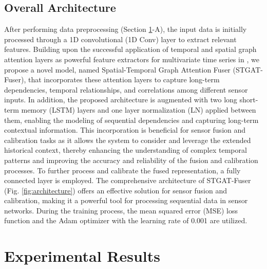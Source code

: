 \documentclass[conference,a4paper]{IEEEtran}
\begin{document}
\subsection{Overall Architecture}
After performing data preprocessing (Section \ref{sec:results}-A), the input data is initially processed through a 1D convolutional (1D Conv) layer to extract relevant features. Building upon the successful application of temporal and spatial graph attention layers as powerful feature extractors for multivariate time series in \cite{MTADGAT}, we propose a novel model, named Spatial-Temporal Graph Attention Fuser (STGAT-Fuser), that incorporates these attention layers to capture long-term dependencies, temporal relationships, and correlations among different sensor inputs. In addition, the proposed architecture is augmented with two long short-term memory (LSTM) layers \cite{lstm} and one layer normalization (LN) \cite{ba2016layer} applied between them, enabling the modeling of sequential dependencies and capturing long-term contextual information. This incorporation is beneficial for sensor fusion and calibration tasks as it allows the system to consider and leverage the extended historical context, thereby enhancing the understanding of complex temporal patterns and improving the accuracy and reliability of the fusion and calibration processes. To further process and calibrate the fused representation, a fully connected layer is employed. The comprehensive architecture of STGAT-Fuser (Fig. \ref{fig:architecture}) offers an effective solution for sensor fusion and calibration, making it a powerful tool for processing sequential data in sensor networks. During the training process, the mean squared error (MSE) loss function and the Adam optimizer \cite{kingma} with the learning rate of 0.001 are utilized.

\section{Experimental Results}
\label{sec:results}
\end{document}
